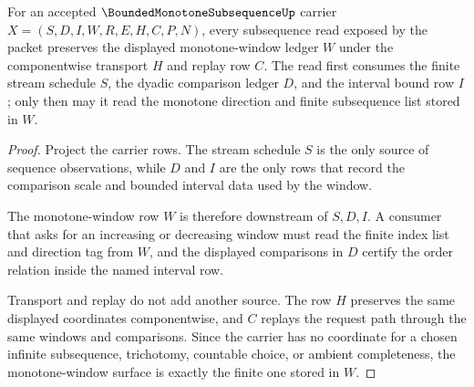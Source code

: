 \begin{theorem}
\label{thm:bounded-monotone-subsequence-monotone-window}
For an accepted $\BoundedMonotoneSubsequenceUp$ carrier $X=(S,D,I,W,R,E,H,C,P,N)$, every subsequence read exposed by the packet preserves the displayed monotone-window ledger $W$ under the componentwise transport $H$ and replay row $C$. The read first consumes the finite stream schedule $S$, the dyadic comparison ledger $D$, and the interval bound row $I$; only then may it read the monotone direction and finite subsequence list stored in $W$.
\end{theorem}
\begin{proof}
Project the carrier rows. The stream schedule $S$ is the only source of sequence observations, while $D$ and $I$ are the only rows that record the comparison scale and bounded interval data used by the window.

The monotone-window row $W$ is therefore downstream of $S,D,I$. A consumer that asks for an increasing or decreasing window must read the finite index list and direction tag from $W$, and the displayed comparisons in $D$ certify the order relation inside the named interval row.

Transport and replay do not add another source. The row $H$ preserves the same displayed coordinates componentwise, and $C$ replays the request path through the same windows and comparisons. Since the carrier has no coordinate for a chosen infinite subsequence, trichotomy, countable choice, or ambient completeness, the monotone-window surface is exactly the finite one stored in $W$.
\end{proof}

